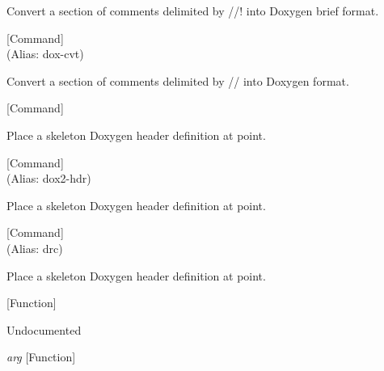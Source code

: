 \begin{doc-string}
Convert a section of comments delimited by //! into Doxygen brief format.
\end{doc-string}

\vspace{1em}
\noindent
{}
\usebox{\funcname}
 \hfill [Command]\\%
 (Alias: dox-cvt)

\begin{doc-string}
Convert a section of comments delimited by // into Doxygen format.
\end{doc-string}

\vspace{1em}
\noindent
{}
\usebox{\funcname}
 \hfill [Command]

\begin{doc-string}
Place a skeleton Doxygen header definition at point.
\end{doc-string}

\vspace{1em}
\noindent
{}
\usebox{\funcname}
 \hfill [Command]\\%
 (Alias: dox2-hdr)

\begin{doc-string}
Place a skeleton Doxygen header definition at point.
\end{doc-string}

\vspace{1em}
\noindent
{}
\usebox{\funcname}
 \hfill [Command]\\%
 (Alias: drc)

\begin{doc-string}
Place a skeleton Doxygen header definition at point.
\end{doc-string}

\vspace{1em}
\noindent
{}
\usebox{\funcname}
 \hfill [Function]

\begin{doc-string}
Undocumented
\end{doc-string}

\vspace{1em}
\noindent
{}
\usebox{\funcname}\emph{arg}
 \hfill [Function]

